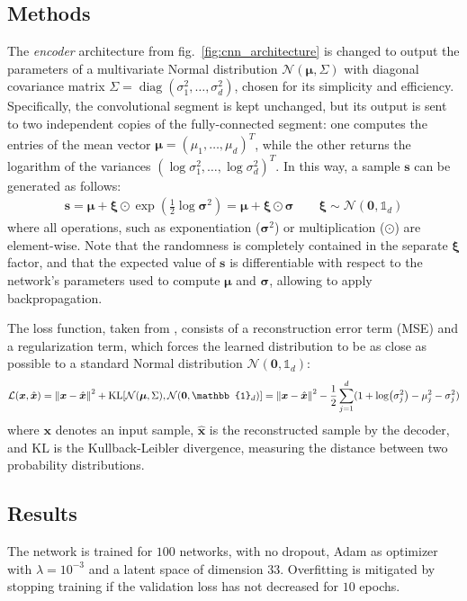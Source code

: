 \documentclass[11pt,a4paper]{scrartcl}
\newcommand{\bb}[1]{\mathbb{#1}}
\begin{document}
\subsection{Methods}
The \textit{encoder} architecture from fig.~\ref{fig:cnn_architecture} is changed to output the parameters of a multivariate Normal distribution $\mathcal{N}(\bm{\mu}, \Sigma)$ with diagonal covariance matrix $\Sigma = \operatorname{diag}(\sigma_1^2, \dots, \sigma_d^2)$, chosen for its simplicity and efficiency. Specifically, the convolutional segment is kept unchanged, but its output is sent to two independent copies of the fully-connected segment: one computes the entries of the mean vector $\bm{\mu} = (\mu_1, \dots, \mu_d)^T$, while the other returns the logarithm of the variances $(\log \sigma_1^2, \dots, \log \sigma_d^2)^T$. In this way, a sample $\bm{s}$ can be generated as follows:     
\begin{align*}
    \bm{s} = \bm{\mu} + \bm{\xi} \odot \exp(\frac{1}{2} \log \bm{\sigma}^2) = \bm{\mu} + \bm{\xi} \odot \bm{\sigma} \qquad \bm{\xi} \sim \mathcal{N}(\bm{0}, \bb{1}_d)
\end{align*}
where all operations, such as exponentiation ($\bm{\sigma}^2$) or multiplication ($\odot$) are element-wise. Note that the randomness is completely contained in the separate $\bm{\xi}$ factor, and that the expected value of $\bm{s}$ is differentiable with respect to the network's parameters used to compute $\bm{\mu}$ and $\bm{\sigma}$, allowing to apply backpropagation.

\medskip

The loss function, taken from \cite{vae}, consists of a reconstruction error term (MSE) and a regularization term, which forces the learned distribution to be as close as possible to a standard Normal distribution $\mathcal{N}(\bm{0}, \bb{1}_d)$:
\begin{align*}
    \mathcal{L}(\bm{x}, \hat{\bm{x}}) = \norm{\bm{x} - \hat{\bm{x}}}^2 + \mathrm{KL}[\mathcal{N}(\bm{\mu}, \Sigma), \mathcal{N}(\bm{0}, \bb{1}_d)] =  \norm{\bm{x} - \hat{\bm{x}}}^2 - \frac{1}{2} \sum_{j=1}^d (1 + \log (\sigma_j^2) - \mu_j^2 - \sigma_j^2) 
\end{align*}
where $\bm{x}$ denotes an input sample, $\hat{\bm{x}}$ is the reconstructed sample by the decoder, and $\mathrm{KL}$ is the Kullback-Leibler divergence, measuring the distance between two probability distributions. 

\subsection{Results}
The network is trained for $100$ networks, with no dropout, Adam as optimizer with $\lambda=10^{-3}$ and a latent space of dimension $33$. Overfitting is mitigated by stopping training if the validation loss has not decreased for $10$ epochs. 
\end{document}
